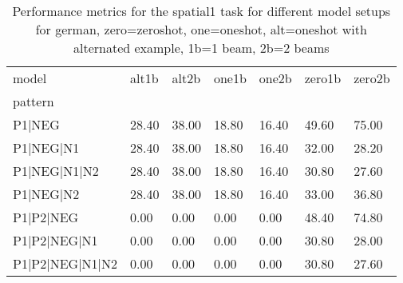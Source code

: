 \begin{table}[h]
\begin{tabular}{l|llllll}
\toprule
model & alt1b & alt2b & one1b & one2b & zero1b & zero2b \\
pattern &  &  &  &  &  &  \\
\midrule
P1|NEG & 28.40 & 38.00 & 18.80 & 16.40 & 49.60 & 75.00 \\
P1|NEG|N1 & 28.40 & 38.00 & 18.80 & 16.40 & 32.00 & 28.20 \\
P1|NEG|N1|N2 & 28.40 & 38.00 & 18.80 & 16.40 & 30.80 & 27.60 \\
P1|NEG|N2 & 28.40 & 38.00 & 18.80 & 16.40 & 33.00 & 36.80 \\
P1|P2|NEG & 0.00 & 0.00 & 0.00 & 0.00 & 48.40 & 74.80 \\
P1|P2|NEG|N1 & 0.00 & 0.00 & 0.00 & 0.00 & 30.80 & 28.00 \\
P1|P2|NEG|N1|N2 & 0.00 & 0.00 & 0.00 & 0.00 & 30.80 & 27.60 \\
\bottomrule
\end{tabular}
\caption{Performance metrics for the spatial1 task for different model setups for german, zero=zeroshot, one=oneshot, alt=oneshot with alternated example, 1b=1 beam, 2b=2 beams}
\label{tab:de_spatial1_performance}
\end{table}
